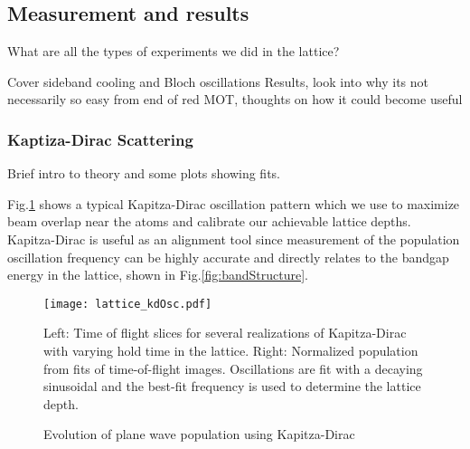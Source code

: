 \subsection{Measurement and results}
\label{ssec:lattice_tests}

What are all the types of experiments we did in the lattice?

Cover sideband cooling and Bloch oscillations
Results, look into why its not necessarily so easy from end of red MOT, thoughts on how it could become useful

\subsubsection{Kaptiza-Dirac Scattering}
\label{sssec:sideband_cooling}

Brief intro to theory and some plots showing fits.


Fig.\;\ref{fig:KDoscillations} shows a typical Kapitza-Dirac oscillation pattern which we use to maximize beam overlap near the atoms and calibrate our achievable lattice depths. Kapitza-Dirac is useful as an alignment tool since measurement of the population oscillation frequency can be highly accurate and directly relates to the bandgap energy in the lattice, shown in Fig.\;\ref{fig:bandStructure}. 


\begin{figure} \label{fig:KDoscillations}
	\texttt{[image: lattice\_kdOsc.pdf]}
	\caption{Evolution of plane wave population using Kapitza-Dirac}{Left: Time of flight slices for several realizations of Kapitza-Dirac with varying hold time in the lattice. Right: Normalized population from fits of time-of-flight images. Oscillations are fit with a decaying sinusoidal and the best-fit frequency is used to determine the lattice depth.}
\end{figure}
	
